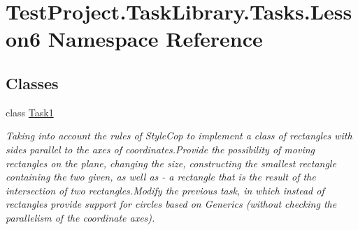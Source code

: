 \hypertarget{namespace_test_project_1_1_task_library_1_1_tasks_1_1_lesson6}{}\section{Test\+Project.\+Task\+Library.\+Tasks.\+Lesson6 Namespace Reference}
\label{namespace_test_project_1_1_task_library_1_1_tasks_1_1_lesson6}
\subsection*{Classes}
\begin{DoxyCompactItemize}
\item 
class \mbox{\hyperlink{class_test_project_1_1_task_library_1_1_tasks_1_1_lesson6_1_1_task1}{Task1}}
\begin{DoxyCompactList}\small\item\em Taking into account the rules of Style\+Cop to implement a class of rectangles with sides parallel to the axes of coordinates.\+Provide the possibility of moving rectangles on the plane, changing the size, constructing the smallest rectangle containing the two given, as well as -\/ a rectangle that is the result of the intersection of two rectangles.\+Modify the previous task, in which instead of rectangles provide support for circles based on Generics (without checking the parallelism of the coordinate axes). \end{DoxyCompactList}\end{DoxyCompactItemize}
